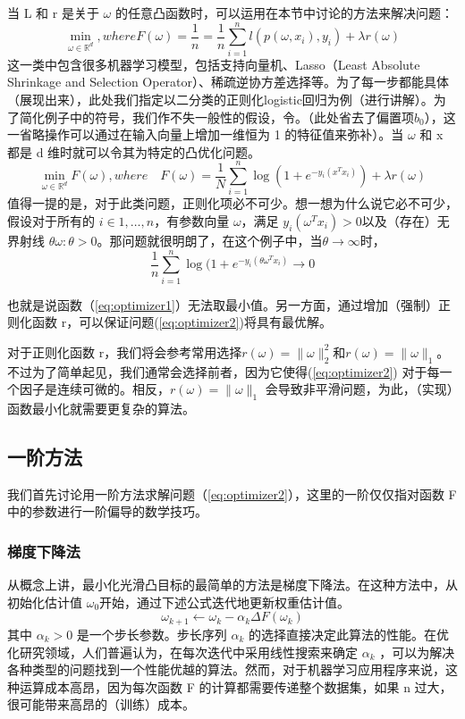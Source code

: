 \documentclass{book}
\begin{document}
当 L 和 r 是关于 $\omega$ 的任意凸函数时，可以运用在本节中讨论的方法来解决问题：
\begin{equation}\label{eq:optimizer1}
	\min_{\omega\in\mathbb{R}^d},where F(\omega)=\frac{1}{n}=\frac{1}{n}\sum_{i=1}^n l(p(\omega,x_i),y_i)+\lambda r(\omega)
\end{equation}
这一类中包含很多机器学习模型，包括支持向量机、Lasso（Least Absolute Shrinkage and Selection Operator）、稀疏逆协方差选择等。为了每一步都能具体（展现出来），此处我们指定以二分类的正则化logistic回归为例（进行讲解）。为了简化例子中的符号，我们作不失一般性的假设，令。（此处省去了偏置项$b_0$），这一省略操作可以通过在输入向量上增加一维恒为 1 的特征值来弥补）。当 $\omega$ 和 x 都是 d 维时就可以令其为特定的凸优化问题。
\begin{equation}\label{eq:optimizer2}
	\min_{\omega\in\mathbb{R}^d}F(\omega),where\quad F(\omega)=\frac{1}{N}\sum_{i=1}^n\log(1+e^{-y_i(x^Tx_i)})+\lambda r(\omega)
\end{equation}
值得一提的是，对于此类问题，正则化项必不可少。想一想为什么说它必不可少，假设对于所有的 $i\in{1,\ldots,n}$，有参数向量 $\omega$，满足 $y_i(\omega^Tx_i) > 0 $以及（存在）无界射线 {$\theta \omega:\theta > 0$}。那问题就很明朗了，在这个例子中，当$\theta\rightarrow \infty$时，
\begin{equation}\label{eq:optimizer3}
	\frac{1}{n}\sum_{i=1}^n\log(1+e^{-y_i(\theta\omega^Tx_i)}\rightarrow 0
\end{equation}


也就是说函数（\ref{eq:optimizer1}）无法取最小值。另一方面，通过增加（强制）正则化函数 r，可以保证问题(\ref{eq:optimizer2})将具有最优解。

对于正则化函数 r，我们将会参考常用选择$r(\omega) = \|\omega\|_2^2$和$r(\omega)=\|\omega\|_1$。不过为了简单起见，我们通常会选择前者，因为它使得(\ref{eq:optimizer2}) 对于每一个因子是连续可微的。相反，$r(\omega) = \|\omega\|_1$ 会导致非平滑问题，为此，（实现）函数最小化就需要更复杂的算法。

\subsection{一阶方法}
我们首先讨论用一阶方法求解问题（\ref{eq:optimizer2}），这里的一阶仅仅指对函数 F 中的参数进行一阶偏导的数学技巧。

\subsubsection{梯度下降法}

从概念上讲，最小化光滑凸目标的最简单的方法是梯度下降法。在这种方法中，从初始化估计值 $\omega_0$开始，通过下述公式迭代地更新权重估计值。
\begin{equation}\label{eq:optimizer4}
	\omega_{k+1}\leftarrow \omega_k - \alpha_k\Delta F(\omega_k)
\end{equation}
其中 $\alpha_k > 0$ 是一个步长参数。步长序列 {$\alpha_k$} 的选择直接决定此算法的性能。在优化研究领域，人们普遍认为，在每次迭代中采用线性搜索来确定 {$\alpha_k$ }，可以为解决各种类型的问题找到一个性能优越的算法。然而，对于机器学习应用程序来说，这种运算成本高昂，因为每次函数 F 的计算都需要传递整个数据集，如果 n 过大，很可能带来高昂的（训练）成本。
\end{document}
